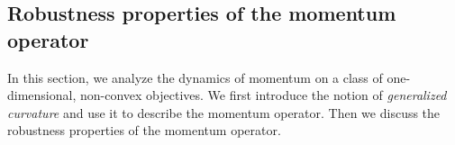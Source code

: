 \documentclass{article}
\newcommand{\forjian}[1]{{\color{magenta}FOR JIAN: #1}}
\begin{document}



\subsection{Robustness properties of the momentum operator}
\label{sec:robust_properties}
In this section, we analyze the dynamics of momentum on a class of one-dimensional, non-convex objectives.
We first introduce the notion of {\em generalized curvature} and use it to describe the momentum operator.
Then we discuss the robustness properties of the momentum operator.
\end{document}
